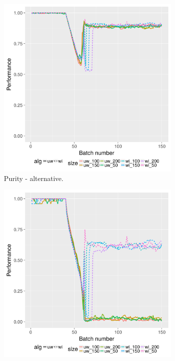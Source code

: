 \begin{figure}[H]
\begin{subfigure}[b]{0.47\textwidth}
                 \includegraphics[width=\textwidth]{standard_alt/evolving_pen_34_37_alternative_purity.png}
                \caption{Purity - alternative.}
                \label{fig:pa_3437}
        \end{subfigure}
        \begin{subfigure}[b]{0.47\textwidth}
          \includegraphics[width=\textwidth]{standard_alt/evolving_pen_34_37_standard_vmeasure.png}

\end{subfigure}
\end{figure}
